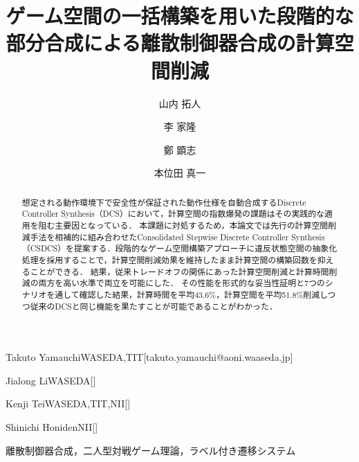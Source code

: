 \documentclass[submit]{ipsj}
\begin{document}
\title{ゲーム空間の一括構築を用いた段階的な部分合成による離散制御器合成の計算空間削減}



\author{山内 拓人}{Takuto Yamauchi}{WASEDA,TIT}[takuto.yamauchi@aoni.waaseda.jp]
\author{李 家隆}{Jialong Li}{WASEDA}[]
\author{鄭 顕志}{Kenji Tei}{WASEDA,TIT,NII}[]
\author{本位田 真一}{Shinichi Honiden}{NII}[]

\begin{abstract}
想定される動作環境下で安全性が保証された動作仕様を自動合成するDiscrete Controller Synthesis（DCS）において，計算空間の指数爆発の課題はその実践的な適用を阻む主要因となっている．
本課題に対処するため，本論文では先行の計算空間削減手法を相補的に組み合わせたConsolidated Stepwise Discrete Controller Synthesis（CSDCS）を提案する．段階的なゲーム空間構築アプローチに違反状態空間の抽象化処理を採用することで，計算空間削減効果を維持したまま計算空間の構築回数を抑えることができる．
結果，従来トレードオフの関係にあった計算空間削減と計算時間削減の両方を高い水準で両立を可能にした．
その性能を形式的な妥当性証明と7つのシナリオを通して確認した結果，計算時間を平均43.6\%，計算空間を平均51.8\%削減しつつ従来のDCSと同じ機能を果たすことが可能であることがわかった．
\end{abstract}
\begin{jkeyword}
離散制御器合成，二人型対戦ゲーム理論，ラベル付き遷移システム
\end{jkeyword}
\end{document}
